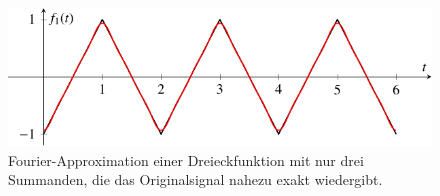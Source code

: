 %
%
%
\begin{figure}
	\centering
	\includegraphics{papers/fourier/images/fourier_Dreieck.pdf}
	\caption{Fourier-Approximation einer Dreieckfunktion mit nur drei Summanden, die das Originalsignal nahezu exakt wiedergibt.%
	\label{fourier:fig:fourierdreieck}}
\end{figure}